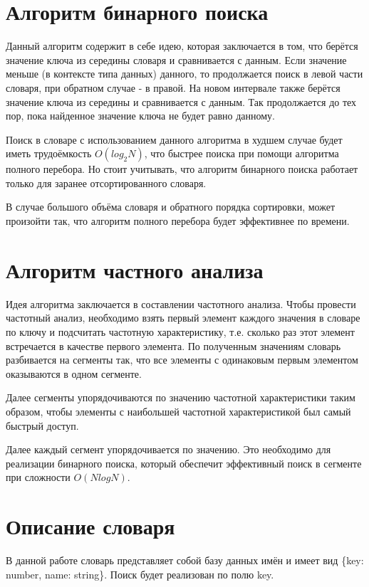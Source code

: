\documentclass[12pt,a4paper]{report}
\begin{document}
\section{Алгоритм бинарного поиска}

Данный алгоритм содержит в себе идею, которая заключается в том, что берётся значение ключа из середины словаря и 
сравнивается с данным. 
Если значение меньше (в контексте типа данных) данного, то продолжается поиск в левой части словаря, при обратном случае - в правой. 
На новом интервале также берётся значение ключа из середины и сравнивается с данным. 
Так продолжается до тех пор, пока найденное значение ключа не будет равно данному.

Поиск в словаре с использованием данного алгоритма в худшем случае будет иметь трудоёмкость $O(log_{2}N)$, что быстрее 
поиска при помощи алгоритма полного перебора. 
Но стоит учитывать, что алгоритм бинарного поиска работает только для заранее отсортированного словаря. 

В случае большого объёма словаря и обратного порядка сортировки, может произойти так, что алгоритм полного перебора 
будет эффективнее по времени.  


\section{Алгоритм частного анализа}


Идея алгоритма заключается в составлении частотного анализа. Чтобы провести частотный анализ, необходимо взять
первый элемент каждого значения в словаре по ключу и подсчитать частотную характеристику, т.е. сколько раз этот 
элемент встречается в качестве первого элемента. По полученным значениям словарь разбивается на сегменты так, 
что все элементы с одинаковым первым элементом оказываются в одном сегменте.

Далее сегменты упорядочиваются по значению частотной характеристики таким образом, чтобы элементы с наибольшей 
частотной характеристикой был самый быстрый доступ.

Далее каждый сегмент упорядочивается по значению. Это необходимо для реализации бинарного поиска, который 
обеспечит эффективный поиск в сегменте при сложности $O(N log N)$.


\section{Описание словаря}

В данной работе словарь представляет собой базу данных имён и имеет вид \{key: number, name: string\}. Поиск 
будет реализован по полю key.
\end{document}
